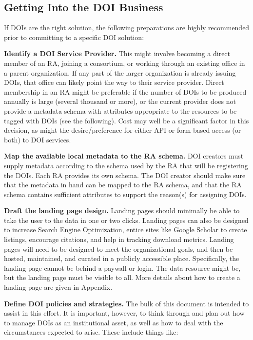 \documentclass[11pt,a4paper]{ivoa}
\begin{document}
\subsection{Getting Into the DOI Business}\hypertarget{getting-into-the-doi-business}{}\label{sec:getting-into-the-doi-business}

If DOIs are the right solution, the following preparations are highly recommended prior to committing to a specific DOI solution:

\textbf{Identify a DOI Service Provider.} This might involve becoming a direct member of an RA, joining a consortium, or working through an existing office in a parent organization. If any part of the larger organization is already issuing DOIs, that office can likely point the way to their service provider. Direct membership in an RA might be preferable if the number of DOIs to be produced annually is large (several thousand or more), or the current provider does not provide a metadata schema with attributes appropriate to the resources to be tagged with DOIs (see the following). Cost may well be a significant factor in this decision, as might the desire/preference for either API or form-based access (or both) to DOI services.

\textbf{Map the available local metadata to the RA schema.} DOI creators must supply metadata according to the schema used by the RA that will be registering the DOIs. Each RA provides its own schema. The DOI creator should make sure that the metadata in hand can be mapped to the RA schema, and that the RA schema contains sufficient attributes to support the reason(s) for assigning DOIs.

\textbf{Draft the landing page design.} Landing pages should minimally be able to take the user to the data in one or two clicks. Landing pages can also be designed to increase Search Engine Optimization, entice sites like Google Scholar to create listings, encourage citations, and help in tracking download metrics. Landing pages will need to be designed to meet the organizational goals, and then be hosted, maintained, and curated in a publicly accessible place. Specifically, the landing page cannot be behind a paywall or login. The data resource might be, but the landing page must be visible to all.\newline
More details about how to create a landing page are given in Appendix.

\textbf{Define DOI policies and strategies.} The bulk of this document is intended to assist in this effort. It is important, however, to think through and plan out how to manage DOIs as an institutional asset, as well as how to deal with the circumstances expected to arise. These include things like:
\end{document}
